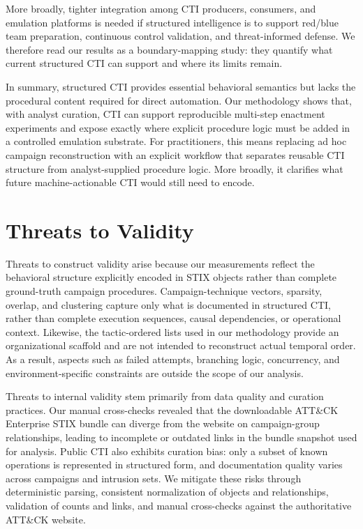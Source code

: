 \documentclass[sigconf]{acmart}
\newcommand{\stix}{STIX\xspace}
\newcommand{\attack}{ATT\&CK\xspace}
\begin{document}
More broadly, tighter integration among CTI producers, consumers, and emulation platforms is needed if structured intelligence is to support red/blue team preparation, continuous control validation, and threat-informed defense. We therefore read our results as a boundary-mapping study: they quantify what current structured CTI can support and where its limits remain.

In summary, structured CTI provides essential behavioral semantics but lacks the procedural content required for direct automation. Our methodology shows that, with analyst curation, CTI can support reproducible multi-step enactment experiments and expose exactly where explicit procedure logic must be added in a controlled emulation substrate. For practitioners, this means replacing ad hoc campaign reconstruction with an explicit workflow that separates reusable CTI structure from analyst-supplied procedure logic. More broadly, it clarifies what future machine-actionable CTI would still need to encode.

\section{Threats to Validity}
\label{sec:validity}

Threats to construct validity arise because our measurements reflect the behavioral structure explicitly encoded in \stix{} objects rather than complete ground-truth campaign procedures. Campaign-technique vectors, sparsity, overlap, and clustering capture only what is documented in structured CTI, rather than complete execution sequences, causal dependencies, or operational context. Likewise, the tactic-ordered lists used in our methodology provide an organizational scaffold and are not intended to reconstruct actual temporal order. As a result, aspects such as failed attempts, branching logic, concurrency, and environment-specific constraints are outside the scope of our analysis.

Threats to internal validity stem primarily from data quality and curation practices. Our manual cross-checks revealed that the downloadable \attack{} Enterprise \stix{} bundle can diverge from the website on campaign-group relationships, leading to incomplete or outdated links in the bundle snapshot used for analysis. Public CTI also exhibits curation bias: only a subset of known operations is represented in structured form, and documentation quality varies across campaigns and intrusion sets. We mitigate these risks through deterministic parsing, consistent normalization of objects and relationships, validation of counts and links, and manual cross-checks against the authoritative \attack{} website.
\end{document}
